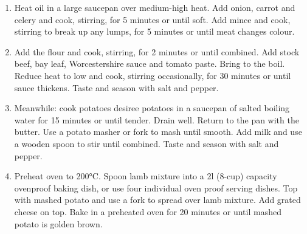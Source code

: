 \documentclass[11pt,a4paper]{article}
\begin{document}
\begin{enumerate}
  \item Heat oil in a large saucepan over medium-high heat. Add onion, carrot and celery and cook, stirring, for 5 minutes or until soft. Add mince and cook, stirring to break up any lumps, for 5 minutes or until meat changes colour.
  \item Add the flour and cook, stirring, for 2 minutes or until combined. Add stock beef, bay leaf, Worcestershire sauce and tomato paste. Bring to the boil. Reduce heat to low and cook, stirring occasionally, for 30 minutes or until sauce thickens. Taste and season with salt and pepper.
  \item Meanwhile: cook potatoes desiree potatoes in a saucepan of salted boiling water for 15 minutes or until tender. Drain well. Return to the pan with the butter. Use a potato masher or fork to mash until smooth. Add milk and use a wooden spoon to stir until combined. Taste and season with salt and pepper.
  \item Preheat oven to 200\si{\celsius}. Spoon lamb mixture into a 2\si{\litre} (8-cup) capacity ovenproof baking dish, or use four individual oven proof serving dishes. Top with mashed potato and use a fork to spread over lamb mixture. Add grated cheese on top. Bake in a preheated oven for 20 minutes or until mashed potato is golden brown.
\end{enumerate}
\end{document}
